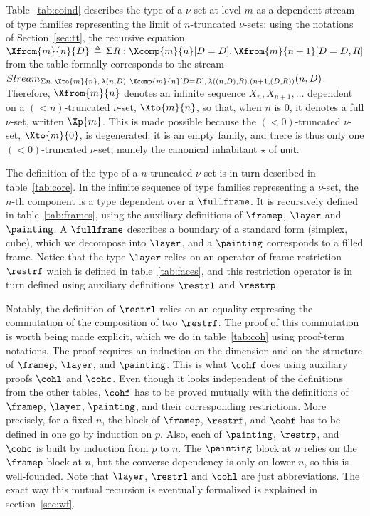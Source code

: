 \documentclass{msc}
\newcommand{\unittype}{\ensuremath{\mathsf{unit}}}
\newcommand{\defeq}{\ensuremath{\triangleq}}
\renewcommand{\D}{D}
\newcommand{\pair}[2]{#1, #2}
\newcommand{\kstar}{{\star}}
\begin{document}
Table~\ref{tab:coind} describes the type of a $\nu$-set at level $m$ as a dependent stream of type families representing the limit of $n$-truncated $\nu$-sets: using the notations of Section~\ref{sec:tt}, the recursive equation $\Xfrom{m}{n}{D} \,\defeq\, \Sigma R: \Xcomp{m}{n}[D=\D].\, \Xfrom{m}{n+1}[D=\pair{D}{R}]$ from the table formally corresponds to the stream $Stream_{\Sigma n.\, \Xto{m}{n},\, \lambda (n, \D).\, \Xcomp{m}{n}[D=\D],\,\lambda ((n, D),R).(n+1,(\pair{D}{R}))}(n, \D)$. Therefore, $\Xfrom{m}{n}$ denotes an infinite sequence $X_{n}, X_{n+1}, \ldots$ dependent on a $(<n)$-truncated $\nu$-set, $\Xto{m}{n}$, so that, when $n$ is $0$, it denotes a full $\nu$-set, written $\Xp{m}$. This is made possible because the $(<0)$-truncated $\nu$-set, $\Xto{m}{0}$, is degenerated: it is an empty family, and there is thus only one $(<0)$-truncated $\nu$-set, namely the canonical inhabitant $\kstar$ of $\unittype$.

The definition of the type of a $n$-truncated $\nu$-set is in turn described in table~\ref{tab:core}. In the infinite sequence of type families representing a $\nu$-set, the $n$-th component is a type dependent over a $\fullframe$. It is recursively defined in table~\ref{tab:frames}, using the auxiliary definitions of $\framep$, $\layer$ and $\painting$. A $\fullframe$ describes a boundary of a standard form (simplex, cube), which we decompose into $\layer$, and a $\painting$ corresponds to a filled frame. Notice that the type $\layer$ relies on an operator of frame restriction $\restrf$ which is defined in table~\ref{tab:faces}, and this restriction operator is in turn defined using auxiliary definitions $\restrl$ and $\restrp$.

Notably, the definition of $\restrl$ relies on an equality expressing the commutation of the composition of two $\restrf$. The proof of this commutation is worth being made explicit, which we do in table~\ref{tab:coh} using proof-term notations. The proof requires an induction on the dimension and on the structure of $\framep$, $\layer$, and $\painting$. This is what $\cohf$ does using auxiliary proofs $\cohl$ and $\cohc$. Even though it looks independent of the definitions from the other tables, $\cohf$ has to be proved mutually with the definitions of $\framep$, $\layer$, $\painting$, and their corresponding restrictions. More precisely, for a fixed $n$, the block of $\framep$, $\restrf$, and $\cohf$ has to be defined in one go by induction on $p$. Also, each of $\painting$, $\restrp$, and $\cohc$ is built by induction from $p$ to $n$. The $\painting$ block at $n$ relies on the $\framep$ block at $n$, but the converse dependency is only on lower $n$, so this is well-founded. Note that $\layer$, $\restrl$ and $\cohl$ are just abbreviations. The exact way this mutual recursion is eventually formalized is explained in section~\ref{sec:wf}.
\end{document}
